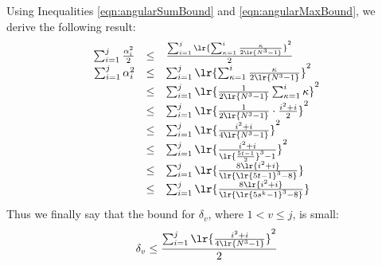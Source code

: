 Using Inequalities \ref{eqn:angularSumBound} and \ref{eqn:angularMaxBound}, we derive the following result:
$$
\begin{array}{rcl}
\sum_{i=1}^j \frac{\alpha_i^2}{2} &\leq& \frac{\sum_{i=1}^j \lr{\sum_{\kappa=1}^i \frac{\kappa}{2\lr{N^3-1} }}^2}{2}\\
\sum_{i=1}^j \alpha_i^2 &\leq& \sum_{i=1}^j \lr{\sum_{\kappa=1}^i \frac{\kappa}{2 \lr{N^3 - 1}}}^2\\
&\leq&\sum_{i=1}^j  \lr{ \frac{1}{2\lr{N^3-1}} \sum_{\kappa=1}^i \kappa}^2\\
&\leq&\sum_{i=1}^j  \lr{ \frac{1}{2\lr{N^3-1}}\cdot \frac{i^2+i}{2}}^2\\
&\leq&\sum_{i=1}^j  \lr{ \frac{i^2+i}{4\lr{N^3-1}}}^2\\
&\leq&\sum_{i=1}^j  \lr{ \frac{i^2 + i}{\lr{\frac{5t-1}{2}}^3 - 1 }}^2\\
&\leq&\sum_{i=1}^j  \lr{ \frac{8\lr{i^2 + i}}{\lr{\lr{5t-1}^3-8 } } }\\
&\leq&\sum_{i=1}^j  \lr{ \frac{8\lr{i^2 + i}}{\lr{\lr{5s^k-1}^3-8 } } }\\
\end{array}$$
Thus we finally say that the bound for $\delta_v$, where $1<v\leq j$, is small:
\begin{equation}\label{eqn:verticalBound}
\delta_v \leq \frac{\sum_{i=1}^j  \lr{ \frac{i^2+i}{4\lr{N^3-1}}}^2}{2}
\end{equation}




